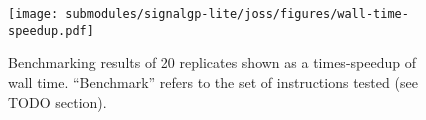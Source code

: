 \begin{figure}[h]

\centering
\texttt{[image: submodules/signalgp-lite/joss/figures/wall-time-speedup.pdf]}

\caption{%
Benchmarking results of 20 replicates shown as a times-speedup of wall time.
``Benchmark'' refers to the set of instructions tested (see TODO section).
} \label{fig:bench-wall}

\end{figure}
